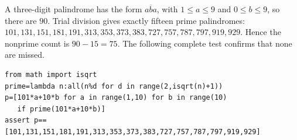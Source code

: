A three-digit palindrome has the form $\overline{aba}$, with $1\le a\le9$ and $0\le b\le9$, so there are $90$. Trial division gives exactly fifteen prime palindromes: $101,131,151,181,191,313,353,373,383,727,757,787,797,919,929$. Hence the nonprime count is $90-15=\boxed{75}$. The following complete test confirms that none are missed.
\begin{verbatim}
from math import isqrt
prime=lambda n:all(n%d for d in range(2,isqrt(n)+1))
p=[101*a+10*b for a in range(1,10) for b in range(10)
   if prime(101*a+10*b)]
assert p==[101,131,151,181,191,313,353,373,383,727,757,787,797,919,929]
\end{verbatim}
